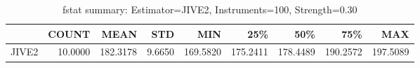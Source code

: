 \begin{table}[ht]
\centering
\caption{fstat summary: Estimator=JIVE2, Instruments=100, Strength=0.30}
\begin{tabular}{lrrrrrrrr}
\toprule
 & COUNT & MEAN & STD & MIN & 25\% & 50\% & 75\% & MAX \\
\midrule
JIVE2 & 10.0000 & 182.3178 & 9.6650 & 169.5820 & 175.2411 & 178.4489 & 190.2572 & 197.5089 \\
\bottomrule
\end{tabular}
\end{table}
